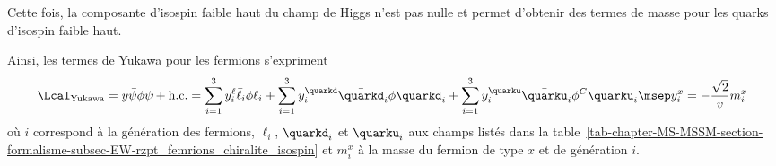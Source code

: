 Cette fois, la composante d'isospin faible haut du champ de Higgs n'est pas nulle et permet d'obtenir des termes de masse pour les quarks d'isospin faible haut.
\par Ainsi, les termes de Yukawa pour les fermions s'expriment
\begin{equation}
\Lcal_\text{Yukawa}
=
y \bar{\psi} \phi \psi + \text{h.c.}
=
\sum_{i=1}^3 y_i^\ell \bar{\ell}_i \phi \ell_i
+ \sum_{i=1}^3 y_i^\quarkd \bar{\quarkd}_i \phi \quarkd_i
+ \sum_{i=1}^3 y_i^\quarku \bar{\quarku}_i \phi^C \quarku_i
\msep
y_i^x = -\frac{\sqrt{2}}{v}m_i^x
\end{equation}
où
$i$ correspond à la génération des fermions,
$\ell_i$, $\quarkd_i$ et $\quarku_i$ aux champs listés dans la table~\ref{tab-chapter-MS-MSSM-section-formalisme-subsec-EW-rzpt_femrions_chiralite_isospin}
et
$m_i^x$ à la masse du fermion de type $x$ et de génération $i$.
